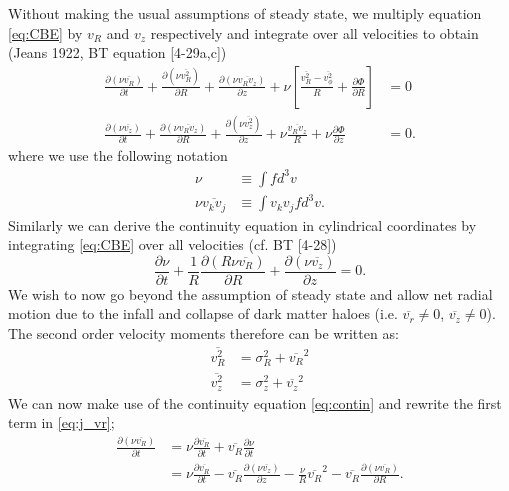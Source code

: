 Without making the usual assumptions of steady state, we multiply equation \ref{eq:CBE} by $v_{R}$ and $v_z$ respectively and integrate over all velocities to obtain (Jeans 1922, BT equation [4-29a,c])
\begin{align} \label{eq:j_vr}
\frac{\partial (\nu \overline{v_R})}{\partial t} + \frac{\partial (\nu \overline{v_R^2})}{\partial R} + \frac{\partial (\nu \overline{v_R v_z})}{\partial z} + \nu \left[ \frac{\overline{v_R^2} - \overline{v_{\phi}^2}}{R} + \frac{\partial \Phi}{\partial R}\right] &= 0\\ \label{eq:j_vz}
\frac{\partial (\nu \overline{v_z})}{\partial t} + \frac{\partial (\nu \overline{v_R v_z})}{\partial R} + \frac{\partial (\nu \overline{v_z^2})}{\partial z} + \nu \frac{\overline{v_R v_z}}{R} + \nu \frac{\partial \Phi}{\partial z}&= 0.
\end{align}
where we use the following notation
\begin{align}
\nu &\equiv \int f d^3 v \\
\nu \overline{v_k v_j} &\equiv \int v_k v_j f d^3 v .
\end{align}
Similarly we can derive the continuity equation in cylindrical coordinates by integrating \ref{eq:CBE} over all velocities (cf. BT [4-28])
\begin{equation} \label{eq:contin}
\frac{\partial \nu}{\partial t} + \frac{1}{R}\frac{\partial (R \nu \overline{v_R})}{\partial R} + \frac{\partial (\nu \overline{v_z})}{\partial z} = 0.
\end{equation}
We wish to now go beyond the assumption of steady state and allow net radial motion due to the infall and collapse of dark matter haloes (i.e. $\overline{v_r} \neq 0$, $\overline{v_z} \neq 0$). The second order velocity moments therefore can be written as:
\begin{align} \label{eq:vr}
\overline{v_R^2} &= \sigma_R^2 + \overline{v_R}^2 \\ \label{eq:vz}
\overline{v_z^2} &= \sigma_z^2 + \overline{v_z}^2
\end{align}
We can now make use of the continuity equation \ref{eq:contin} and rewrite the first term in \ref{eq:j_vr};
\begin{align}
\frac{\partial ( \nu \overline{v_R})}{\partial t} &= \nu \frac{\partial \overline{v_R}}{\partial t} + \overline{v_R} \frac{\partial \nu}{\partial t} \\
&= \nu \frac{\partial \overline{v_R}}{\partial t} - \overline{v_R}\frac{\partial (\nu \overline{v_z})}{\partial z} - \frac{\nu}{R}\overline{v_R}^2 - \overline{v_R} \frac{\partial (\nu \overline{v_R})}{\partial R}.
\end{align}
